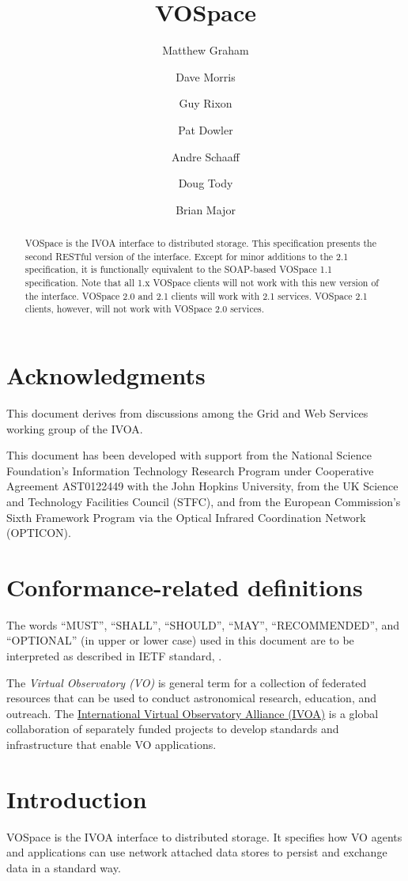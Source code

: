 \documentclass[11pt,a4paper]{ivoa}
\title{VOSpace}
\author{Matthew Graham}
\author{Dave Morris}
\author{Guy Rixon}
\author{Pat Dowler}
\author{Andre Schaaff}
\author{Doug Tody}
\author{Brian Major}
\begin{document}
\begin{abstract}
VOSpace is the IVOA interface to distributed storage. This specification presents the second RESTful version of the interface.  Except for minor additions to the 2.1 specification, it is functionally equivalent to the SOAP-based VOSpace 1.1 specification. Note that all 1.x VOSpace clients will not work with this new version of the interface.  VOSpace 2.0 and 2.1 clients will work with 2.1 services.  VOSpace 2.1 clients, however, will not work with VOSpace 2.0 services.
\end{abstract}

\section*{Acknowledgments}
\label{sec:acknowledgments}
This document derives from discussions among the Grid and Web Services working group of the IVOA.

This document has been developed with support from the National Science Foundation's Information Technology Research Program under Cooperative Agreement AST0122449 with the John Hopkins University, from the UK Science and Technology Facilities Council (STFC), and from the European Commission's Sixth Framework Program via the Optical Infrared Coordination Network (OPTICON).

\section*{Conformance-related definitions}
\label{sec:conformance-related definitions}
The words ``MUST'', ``SHALL'', ``SHOULD'', ``MAY'', ``RECOMMENDED'', and
``OPTIONAL'' (in upper or lower case) used in this document are to be
interpreted as described in IETF standard, \citep{std:RFC2119}.

The \emph{Virtual Observatory (VO)} is
general term for a collection of federated resources that can be used
to conduct astronomical research, education, and outreach.
The \href{http://www.ivoa.net}{International
Virtual Observatory Alliance (IVOA)} is a global
collaboration of separately funded projects to develop standards and
infrastructure that enable VO applications.

\section{Introduction}
\label{sec:introduction}
VOSpace is the IVOA interface to distributed storage. It specifies how VO agents and applications can use network attached data stores to persist and exchange data in a standard way.
\end{document}
